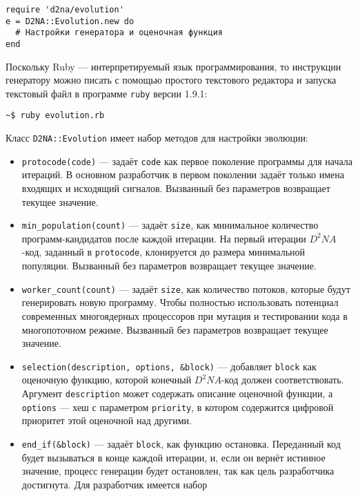 \documentclass[utf8,a5paper,portrait,10pt]{eskdtext}
\begin{document}
\begin{verbatim}
require 'd2na/evolution'
e = D2NA::Evolution.new do
  # Настройки генератора и оценочная функция
end
\end{verbatim}

Поскольку Ruby — интерпретируемый язык программирования, то инструкции
генератору можно писать с помощью простого текстового редактора и запуска
текстовый файл в программе \texttt{ruby} версии 1.9.1:

\begin{verbatim}
~$ ruby evolution.rb
\end{verbatim}

Класс \texttt{D2NA::Evolution} имеет набор методов для настройки эволюции:
\begin{itemize}
  \item \texttt{protocode(code)} — задаёт \texttt{code} как первое поколение
        программы для начала итераций. В основном разработчик в первом поколении
        задаёт только имена входящих и исходящий сигналов.
        Вызванный без параметров возвращает текущее значение.
  \item \texttt{min\_population(count)} — задаёт \texttt{size}, как минимальное
        количество программ-кандидатов после каждой итерации. На первый итерации
        $D^2NA$-код, заданный в \texttt{protocode}, клонируется до размера
        минимальной популяции.
        Вызванный без параметров возвращает текущее значение.
  \item \texttt{worker\_count(count)} — задаёт \texttt{size}, как количество
        потоков, которые будут генерировать новую программу. Чтобы полностью
        использовать потенциал современных многоядерных процессоров при
        мутация и тестировании кода в многопоточном режиме.
        Вызванный без параметров возвращает текущее значение.
  \item \texttt{selection(description, options, \&block)} — добавляет
        \texttt{block} как оценочную функцию, которой конечный $D^2NA$-код
        должен соответствовать. Аргумент \texttt{description} может содержать
        описание оценочной функции, а \texttt{options} — хеш с параметром
        \texttt{priority}, в котором содержится цифровой приоритет этой
        оценочной над другими.
  \item \texttt{end\_if(\&block)} — задаёт \texttt{block}, как функцию
        остановка. Переданный код будет вызываться в конце каждой итерации, и,
        если он вернёт истинное значение, процесс генерации будет остановлен,
        так как цель разработчика достигнута. Для разработчик имеется набор

\end{itemize}
\end{document}
